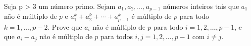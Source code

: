 Seja p > 3 um número primo. Sejam $a_1, a_2, \dots, a_{p-1}$ números inteiros tais que $a_1$ não é múltiplo de $p$ e $a^k_1 + a^k_2 + \cdots + a^k_{p-1}$ é múltiplo de $p$ para todo $k = 1, \dots, p-2$.
Prove que $a_i$ não é múltiplo de $p$ para todo $i = 1, 2, \dots, p-1$, e que $a_i - a_j$ não é múltiplo de $p$ para todos $i, j = 1, 2, \dots, p-1$ com $i \neq j$.
